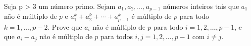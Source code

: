 Seja p > 3 um número primo. Sejam $a_1, a_2, \dots, a_{p-1}$ números inteiros tais que $a_1$ não é múltiplo de $p$ e $a^k_1 + a^k_2 + \cdots + a^k_{p-1}$ é múltiplo de $p$ para todo $k = 1, \dots, p-2$.
Prove que $a_i$ não é múltiplo de $p$ para todo $i = 1, 2, \dots, p-1$, e que $a_i - a_j$ não é múltiplo de $p$ para todos $i, j = 1, 2, \dots, p-1$ com $i \neq j$.
